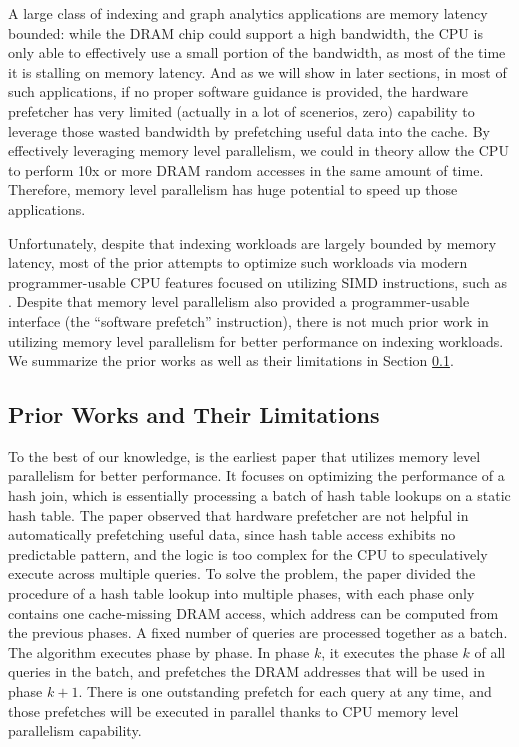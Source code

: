 \documentclass[11pt, usletter]{article}
\begin{document}
A large class of indexing and graph analytics applications are memory latency bounded: 
while the DRAM chip could support a high bandwidth, 
the CPU is only able to effectively use a small portion of the bandwidth, 
as most of the time it is stalling on memory latency.
And as we will show in later sections, 
in most of such applications, if no proper software guidance is provided, 
the hardware prefetcher has very limited (actually in a lot of scenerios, zero)
capability to leverage those wasted bandwidth by prefetching useful data into the cache. 
By effectively leveraging memory level parallelism, 
we could in theory allow the CPU to perform 10x or more DRAM random accesses 
in the same amount of time. Therefore, memory level parallelism has huge potential to speed up those applications.

Unfortunately, despite that indexing workloads are largely bounded by memory latency, 
most of the prior attempts to optimize such workloads via modern programmer-usable CPU features 
focused on utilizing SIMD instructions, such as \cite{fast_sigmod10, arttrie_icde13, masstree, hot_sigmod18}.
Despite that memory level parallelism also provided a programmer-usable interface (the ``software prefetch'' instruction), 
there is not much prior work in utilizing memory level parallelism for better performance on indexing workloads. 
We summarize the prior works as well as their limitations in Section \ref{relwork}.

\subsection{Prior Works and Their Limitations} \label{relwork}


To the best of our knowledge,
\cite{hashjoin_icde04} is the earliest paper that utilizes memory level parallelism for better performance. 
It focuses on optimizing the performance of a hash join, which is essentially processing a batch of hash table lookups on a static hash table. 
The paper observed that hardware prefetcher are not helpful in automatically prefetching useful data, 
since hash table access exhibits no predictable pattern, 
and the logic is too complex for the CPU to speculatively execute across multiple queries.
To solve the problem, the paper divided the procedure of a hash table lookup into multiple phases, 
with each phase only contains one cache-missing DRAM access, which address can be computed from the previous phases.
A fixed number of queries are processed together as a batch. 
The algorithm executes phase by phase. In phase $k$, it executes the phase $k$ of all queries in the batch, 
and prefetches the DRAM addresses that will be used in phase $k+1$.
There is one outstanding prefetch for each query at any time, 
and those prefetches will be executed in parallel thanks to CPU memory level parallelism capability.
\end{document}
